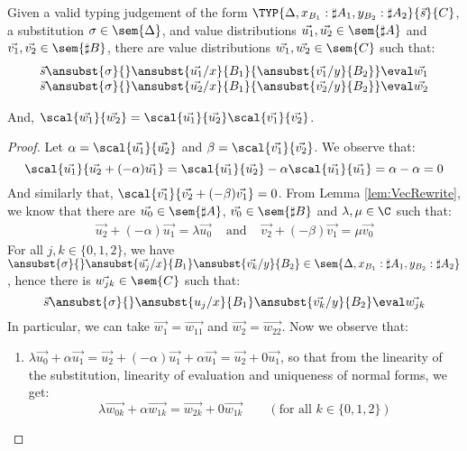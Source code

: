 \begin{lemma}\label{lem:UnitPreserTens} %
Given a valid typing judgement of the form $\TYP{\Delta,x_{B_1}:\sharp A_1, y_{B_2}:\sharp A_2}{\vec{s}}{C}$, a substitution $\sigma\in\sem{\Delta}$, and value distributions $\vec{u_1},\vec{u_2}\in\sem{\sharp A}$ and $\vec{v_1},\vec{v_2}\in\sem{\sharp B}$, there are value distributions $\vec{w_1},\vec{w_2}\in\sem{C}$ such that:
\[
\begin{array}{c}
    \vec{s}\ansubst{\sigma}{}\ansubst{\vec{u_1}/x}{B_1}{\ansubst{\vec{v_1}/y}{B_2}}\eval\vec{w_1}\\
    \vec{s}\ansubst{\sigma}{}\ansubst{\vec{u_2}/x}{B_1}{\ansubst{\vec{v_2}/y}{B_2}}\eval\vec{w_2}\\
\end{array}
\]

And, $\scal{\vec{w_1}}{\vec{w_2}} = \scal{\vec{u_1}}{\vec{u_2}} \scal{\vec{v_1}}{\vec{v_2}}$.

\begin{proof}
    Let $\alpha=\scal{\vec{u_1}}{\vec{u_2}}$ and $\beta=\scal{\vec{v_1}}{\vec{v_2}}$. We observe that:
    \[
    \scal{\vec{u_1}}{\vec{u_2}+(-\alpha)\vec{u_1}} = \scal{\vec{u_1}}{\vec{u_2}} - \alpha \scal{\vec{u_1}}{\vec{u_1}} = \alpha - \alpha = 0
    \]
    And similarly that, $\scal{\vec{v_1}}{\vec{v_2}+ (-\beta) \vec{v_1}} = 0$. From Lemma \ref{lem:VecRewrite}, we know that there are $\vec{u_0}\in\sem{\sharp A}$, $\vec{v_0}\in\sem{\sharp B}$ and $\lambda,\mu\in\C$ such that:
    \begin{align*}
        \vec{u_2} +(-\alpha)\vec{u_1} = \lambda\vec{u_0}& \text{ and } & \vec{v_2} + (-\beta)\vec{v_1} = \mu\vec{v_0} 
    \end{align*}
    For all $j,k\in\{0,1,2\}$, we have$\ansubst{\sigma}{}\ansubst{\vec{u_j}/x}{B_1}\ansubst{\vec{v_k}/y}{B_2}\in\sem{\Delta,x_{B_1}:\sharp A_1, y_{B_2}:\sharp A_2}$, hence there is $\vec{w_{jk}}\in\sem{C}$ such that:
    \[
    \vec{s}\ansubst{\sigma}{}\ansubst{u_j/x}{B_1}\ansubst{\vec{v_k}/y}{B_2}\eval\vec{w_{jk}}
    \]
    In particular, we can take $\vec{w_1}=\vec{w_{11}}$ and $\vec{w_2}=\vec{w_{22}}$. Now we observe that:
    \begin{enumerate}
        \item\label{A9:it1} $\lambda \vec{u_0} + \alpha\vec{u_1}=\vec{u_2} + (-\alpha) \vec{u_1} + \alpha \vec{u_1} = \vec{u_2} + 0 \vec{u_1}$, so that from the linearity of the substitution, linearity of evaluation and uniqueness of normal forms, we get:
        \[
        \lambda\vec{w_{0k}} + \alpha \vec{w_{1k}} = \vec{w_{2k}} + 0 \vec{w_{1k}} \qquad(\text{for all }k\in\{0,1,2\})
        \]
        

\end{enumerate}
\end{proof}
\end{lemma}
